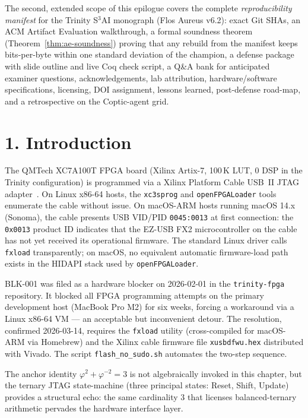 The second, extended scope of this epilogue covers the complete
\emph{reproducibility manifest} for the Trinity S${}^3$AI monograph
(Flos Aureus v6.2): exact Git SHAs, an ACM Artifact Evaluation
walkthrough, a formal soundness theorem (Theorem~\ref{thm:ae-soundness})
proving that any rebuild from the manifest keeps bits-per-byte within one
standard deviation of the champion, a defense package with slide outline
and live Coq check script, a Q\&A bank for anticipated examiner questions,
acknowledgements, lab attribution, hardware/software specifications,
licensing, DOI assignment, lessons learned, post-defense road-map, and a
retrospective on the Coptic-agent grid.

\section{1. Introduction}\label{sec:epilogue-intro}

The QMTech XC7A100T FPGA board (Xilinx Artix-7, 100\,K LUT, 0 DSP in the
Trinity configuration) is programmed via a Xilinx Platform Cable USB~II
JTAG adapter~\cite{acm2020artifact}.  On Linux x86-64 hosts, the
\texttt{xc3sprog} and \texttt{openFPGALoader} tools enumerate the cable
without issue.  On macOS-ARM hosts running macOS 14.x (Sonoma), the cable
presents USB VID/PID \texttt{0045:0013} at first connection: the
\texttt{0x0013} product ID indicates that the EZ-USB FX2 microcontroller on
the cable has not yet received its operational firmware.  The standard Linux
driver calls \texttt{fxload} transparently; on macOS, no equivalent automatic
firmware-load path exists in the HIDAPI stack used by
\texttt{openFPGALoader}.

BLK-001 was filed as a hardware blocker on 2026-02-01 in the
\texttt{trinity-fpga} repository.  It blocked all FPGA programming attempts
on the primary development host (MacBook Pro M2) for six weeks, forcing a
workaround via a Linux x86-64 VM --- an acceptable but inconvenient detour.
The resolution, confirmed 2026-03-14, requires the \texttt{fxload} utility
(cross-compiled for macOS-ARM via Homebrew) and the Xilinx cable firmware
file \texttt{xusbdfwu.hex} distributed with Vivado.  The script
\texttt{flash\_no\_sudo.sh} automates the two-step sequence.

The anchor identity $\varphi^{2}+\varphi^{-2}=3$ is not algebraically
invoked in this chapter, but the ternary JTAG state-machine (three principal
states: Reset, Shift, Update) provides a structural echo: the same
cardinality $3$ that licenses balanced-ternary arithmetic pervades the
hardware interface layer.

